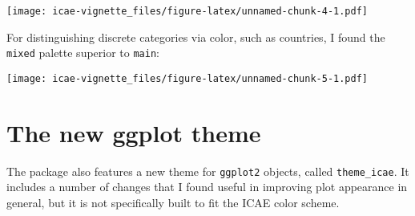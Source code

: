 \documentclass[]{article}
\newenvironment{Shaded}{\begin{snugshade}}{\end{snugshade}}
\newcommand{\KeywordTok}[1]{\textcolor[rgb]{0.13,0.29,0.53}{\textbf{#1}}}
\newcommand{\DataTypeTok}[1]{\textcolor[rgb]{0.13,0.29,0.53}{#1}}
\newcommand{\StringTok}[1]{\textcolor[rgb]{0.31,0.60,0.02}{#1}}
\newcommand{\OperatorTok}[1]{\textcolor[rgb]{0.81,0.36,0.00}{\textbf{#1}}}
\newcommand{\NormalTok}[1]{#1}
\begin{document}
\texttt{[image: icae-vignette\_files/figure-latex/unnamed-chunk-4-1.pdf]}

For distinguishing discrete categories via color, such as countries, I
found the \texttt{mixed} palette superior to \texttt{main}:

\begin{Shaded}
\end{Shaded}

\texttt{[image: icae-vignette\_files/figure-latex/unnamed-chunk-5-1.pdf]}

\section{The new ggplot theme}\label{the-new-ggplot-theme}

The package also features a new theme for \texttt{ggplot2} objects,
called \texttt{theme\_icae}. It includes a number of changes that I
found useful in improving plot appearance in general, but it is not
specifically built to fit the ICAE color scheme.
\end{document}

